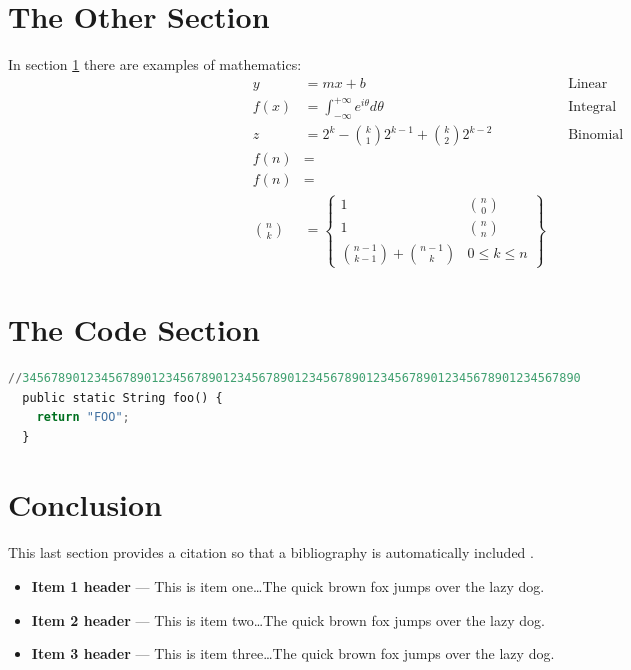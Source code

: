 \documentclass[11pt]{article}%
\begin{document}
\begin{multicols*}{2}
\section{The Other Section}
\label{The Other Section}

In section \ref{The Other Section} there are examples of
mathematics:\begin{align}
 y &= mx+b && \text{Linear} \\
 f(x) &= \int_{-\infty}^{+\infty} e^{i\theta} d\theta && \text{Integral} \\
 z &= 2^k-\binom{k}{1}2^{k-1}+\binom{k}{2}2^{k-2} &&\text{Binomial} \\
 f(n) &= \\
 f(n) &= \\
 {n \choose k} &= \begin{Bmatrix} 1 & {n \choose 0} \\ 1 & {n \choose n} \\ {n - 1 \choose k - 1} + {n - 1 \choose k} & 0 \le k \le n \end{Bmatrix} 
\end{align}

\section{The Code Section}
\label{The Code Section}

\begin{lstlisting}[language=Python,caption=\code{foo} method,label=foo]
//345678901234567890123456789012345678901234567890123456789012345678901234567890
  public static String foo() {
    return "FOO";
  }
\end{lstlisting}

\section{Conclusion}
\label{Conclusion}

This last section provides a citation so that a bibliography is
automatically included \parencite{book:linear-algebra}.

\begin{itemize}
\item {\bf Item 1 header} --- This is item one\dots The quick brown fox jumps
over the lazy dog.
\item {\bf Item 2 header} --- This is item two\dots The quick brown fox jumps
over the lazy dog.
\item {\bf Item 3 header} --- This is item three\dots The quick brown fox jumps
over the lazy dog.
\end{itemize}



\end{multicols*}
\end{document}
